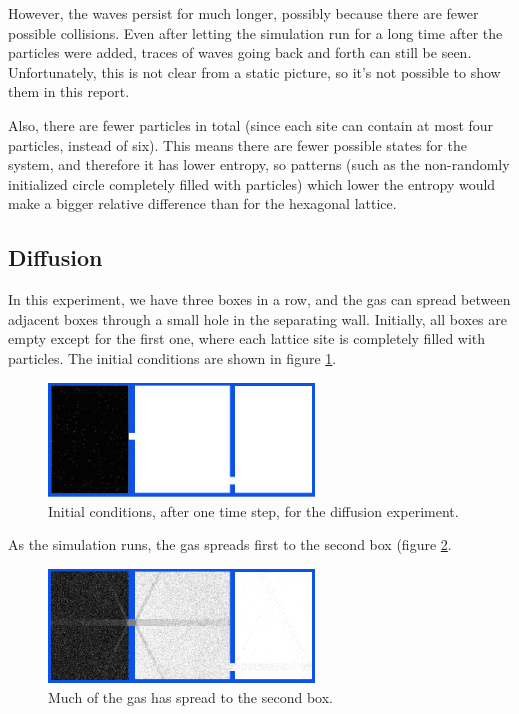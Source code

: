 \documentclass[12pt,a4paper]{article}
\begin{document}
However, the waves persist for much longer, possibly because there are fewer possible collisions.
Even after letting the simulation run for a long time after the particles were added, traces of waves
going back and forth can still be seen. Unfortunately, this is not clear from a static picture, so
it's not possible to show them in this report.

Also, there are fewer particles in total (since each site can contain at most four particles, instead of six).
This means there are fewer possible states for the system, and therefore it has lower entropy, so patterns
(such as the non-randomly initialized circle completely filled with particles) which lower the entropy would make
a bigger relative difference than for the hexagonal lattice.

\subsection{Diffusion}
In this experiment, we have three boxes in a row, and the gas can spread between adjacent boxes through a small
hole in the separating wall. Initially, all boxes are empty except for the first one, where each lattice site
is completely filled with particles. The initial conditions are shown in figure \ref{diffusioninit}.

\begin{figure}[htp]
\centering
  \includegraphics[width=200pt]{figs/diffusioninit.png}
\caption{Initial conditions, after one time step, for the diffusion experiment.}
\label{diffusioninit}
\end{figure}

As the simulation runs, the gas spreads first to the second box (figure \ref{diffusionbox2fill}.
\begin{figure}[htp]
\centering
  \includegraphics[width=200pt]{figs/diffusionbox2fill.png}
\caption{Much of the gas has spread to the second box.}
\label{diffusionbox2fill}
\end{figure}
\end{document}
